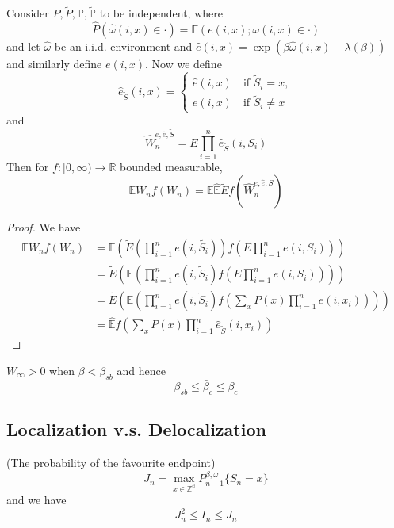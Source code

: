 \begin{proposition}
    Consider $P,\tilde{P},\mathbb{P},\tilde{\mathbb{P}}$ to be independent, where
    \[
    \hat{P}(\hat\omega(i,x) \in \cdot) = \mathbb{E}(e(i,x); \omega(i,x)\in \cdot)
    \] and let $\hat{\omega}$ be an i.i.d. environment and $\hat{e}(i,x) = \exp(\beta\hat{\omega}(i,x) - \lambda(\beta))$ and similarly define $e(i,x)$. Now we define
    \[
    \hat{e}_{\tilde{S}}(i,x) = \begin{cases}
        \hat{e}(i,x)\quad\text{if }\tilde{S}_i = x,\\
        e(i,x)\quad\text{if }\tilde{S}_i \neq x
    \end{cases}
    \]
    and
    \[
    \hat{W}_n^{e,\hat{e},\tilde{S}} = E\prod_{i=1}^n \hat{e}_{\tilde{S}}(i,S_i)
    \]
    Then for $f:[0,\infty) \to \mathbb{R}$ bounded measurable,
    \[
    \mathbb{E} W_nf(W_n) = \mathbb{E}\hat{\mathbb{E}} \tilde{E}f( \hat{W}_n^{e,\hat{e},\tilde{S}})
    \]
\end{proposition}
\begin{proof}
    We have
    \[
    \begin{aligned}
        \mathbb{E}W_n f(W_n) &= \mathbb{E}\left(\tilde{E}\left(\prod_{i=1}^n e(i,\tilde{S_i})\right)f\left(E\prod_{i=1}^n e(i,S_i)\right)\right) \\
        & = \tilde{E}\left(\mathbb{E}\left(\prod_{i=1}^n e(i,\tilde{S}_i) f\left(E\prod_{i=1}^n e(i,S_i)\right)\right)\right) \\
        &=\tilde{E}\left(\mathbb{E}\left(\prod_{i=1}^n e(i,\tilde{S}_i) f\left(\sum_{x} P(x)\prod_{i=1}^n e(i,x_i)\right)\right)\right) \\
        &= \hat{\mathbb{E}}f\left(\sum_{x} P(x)\prod_{i=1}^n \hat{e}_{\tilde{S}}(i,x_i)\right)
    \end{aligned}
    \]
\end{proof}

\begin{theorem}
    $W_{\infty} > 0$ when $\beta < \beta_{sb}$ and hence
    \[
    \beta_{sb} \leq \bar{\beta}_c \leq \beta_c
    \]
\end{theorem}


\subsection{Localization v.s. Delocalization}

\begin{definition}
    (The probability of the favourite endpoint)
    \[
    J_n = \max_{x\in\mathbb{Z^d}}P_{n-1}^{\beta,\omega}\{S_n = x\}
    \]
    and we have
    \[
    J_n^2 \leq I_n \leq J_n
    \]
\end{definition}

